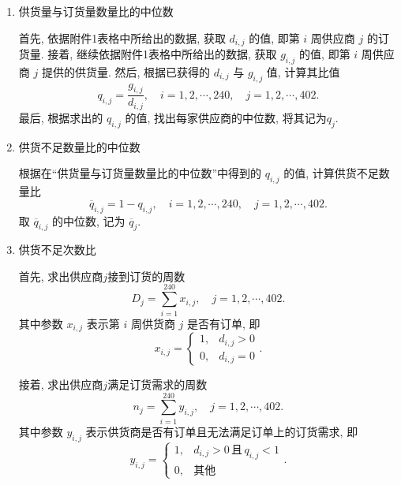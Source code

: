 \documentclass[11pt, fontset = windows]{article}
\begin{document}
\begin{enumerate}
    \item 供货量与订货量数量比的中位数

          首先, 依据附件1表格中所给出的数据, 获取 $d_{i,j}$ 的值, 即第 $i$ 周供应商 $j$ 的订货量.
          接着, 继续依据附件1表格中所给出的数据, 获取 $g_{i,j}$ 的值, 即第 $i$ 周供应商 $j$ 提供的供货量.
          然后, 根据已获得的 $d_{i,j}$ 与 $g_{i,j}$ 值, 计算其比值
          \begin{equation}
              q_{i,j}=\frac{ g_{i,j}}{ d_{i,j}},\quad i=1,2,\cdots,240,\quad j=1,2,\cdots,402.
          \end{equation}
          最后, 根据求出的 $q_{i,j}$ 的值, 找出每家供应商的中位数, 将其记为$q_j$.

    \item 供货不足数量比的中位数

          根据在“供货量与订货量数量比的中位数”中得到的 $q_{i,j}$ 的值, 计算供货不足数量比
          \begin{equation}
              \overline{q}_{i,j}=1-q_{i,j},\quad i=1,2,\cdots,240,\quad j=1,2,\cdots,402.
          \end{equation}
          取 $\overline{q}_{i,j}$ 的中位数, 记为 $\overline{q}_{j}$.

    \item 供货不足次数比

          首先, 求出供应商$j$接到订货的周数
          \begin{equation}
              \label{接到订货的周数}
              D_j=\sum_{i=1}^{240}x_{i,j},\quad j=1,2,\cdots,402.
          \end{equation}
          其中参数 $x_{i,j}$ 表示第 $i$ 周供货商 $j$ 是否有订单, 即
          \begin{equation}
              x_{i,j}=
              \begin{cases}
                  1, & d_{i,j} > 0 \\
                  0, & d_{i,j} = 0
              \end{cases}.
          \end{equation}

          接着, 求出供应商$j$满足订货需求的周数
          \begin{equation}
              \label{满足订货需求的周数}
              n_j=\sum_{i=1}^{240}y_{i,j},\quad j=1,2,\cdots,402.
          \end{equation}
          其中参数 $y_{i,j}$ 表示供货商是否有订单且无法满足订单上的订货需求, 即
          \begin{equation}
              y_{i,j}=
              \begin{cases}
                  1, & d_{i,j} > 0\,\mbox{且}\,q_{i,j} < 1 \\
                  0, & \mbox{其他}
              \end{cases}.
          \end{equation}


\end{enumerate}
\end{document}
